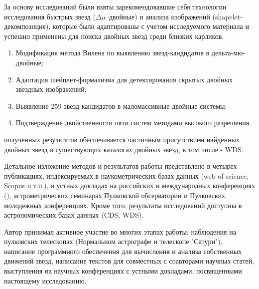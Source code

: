 {\methods} За основу исследований были взяты зарекомендовавшие себя технологии исследования быстрых звезд ($\Delta\mu$--двойные) и анализа изображений (shapelet-декомпозиция), которые были адаптированы с учетом исследуемого материала и успешно применены для поиска двойных звезд среди близких карликов.

{}
\begin{enumerate}
  \item Модификация метода Вилена по выявлению звезд-кандидатов в дельта-мю-двойные;
  \item Адаптация шейплет-формализма для детектирования скрытых двойных звездных изображений;
  \item Выявление 259 звезд-кандидатов в маломассивные двойные системы;
  \item Подтверждение двойственности пяти систем методами высокого разрешения.
\end{enumerate}


{\reliability} полученных результатов обеспечивается частичным присутствием найденных двойных звезд в существующих каталогах двойных звезд, в том числе - WDS.


{\probation}
Детальное изложение методов и результатов работы представлено в четырех публикациях, индексируемых в наукометрических базах данных (web of science, Scopus и т.п.), в устных докладах на российских и международных конференциях (), астрометрических семинарах Пулковской обсерватории и Пулковских молодежных конференциях. Кроме того, результаты исследований доступны в астрономических базах данных (CDS, WDS).

{\contribution} Автор принимал активное участие во многих этапах работы: наблюдения на пулковских  телескопах (Нормальном астрографе и телескопе "Сатурн"), написание программного обеспечения для вычисления и анализа собственных движений звезд, написание текстов для совместных с соавторами научных статей, выступления на научных конференциях с устными докладами, посвященными настоящему исследованию. 

